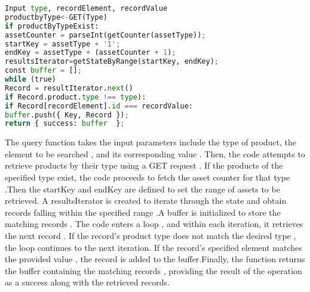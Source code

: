 \begin{lstlisting}[language=Python , caption=User query]
Input type, recordElement, recordValue
productbyType<-GET(Type)
if productByTypeExist:
assetCounter = parseInt(getCounter(assetType));
startKey = assetType + '1';
endKey = assetType + (assetCounter + 1);
resultsIterator=getStateByRange(startKey, endKey);
const buffer = [];
while (true) 
Record = resultIterator.next() 
if Record.product.type !== type):
if Record[recordElement].id === recordValue:
buffer.push({ Key, Record });
return { success: buffer  };   
\end{lstlisting}
The query function takes the input parameters include the type of product, the element to be searched , and its corresponding value . Then, the code attempts to retrieve products by their type using a GET request . If the products of the specified type exist, the code proceeds to fetch the asset counter for that type .Then the startKey and endKey are defined to set the range of assets to be retrieved. A resultsIterator is created to iterate through the state and obtain records falling within the specified range .A buffer is initialized to store the matching records . The code enters a loop , and within each iteration, it retrieves the next record . If the record's product type does not match the desired type , the loop continues to the next iteration. If the record's specified element  matches the provided value , the record is added to the buffer.Finally, the function returns the buffer containing the matching records , providing the result of the operation as a success along with the retrieved records.






